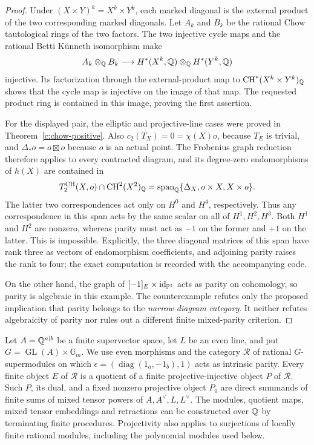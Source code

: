 \begin{proof}
Under $(X\times Y)^k=X^k\times Y^k$, each marked diagonal is
the external product of the two corresponding marked diagonals.
Let $A_k$ and $B_k$ be the rational Chow tautological rings of the
two factors.  The two injective cycle maps and the rational Betti
K\"unneth isomorphism make
\[
 A_k\otimes_\mathbb Q B_k\longrightarrow
 H^*(X^k,\mathbb Q)\otimes_\mathbb Q H^*(Y^k,\mathbb Q)
\]
injective.  Its factorization through the external-product map
to $\operatorname{CH}^*(X^k\times Y^k)_\mathbb Q$ shows that the cycle map is
injective on the image of that map.  The requested product ring
is contained in this image, proving the first assertion.

For the displayed pair, the elliptic and projective-line cases
were proved in Theorem~\ref{c:chow-positive}.
Also $c_2(T_X)=0=\chi(X)o$, because $T_E$ is trivial, and
$\Delta_*o=o\boxtimes o$ because $o$ is an actual point.
The Frobenius graph reduction therefore applies to every
contracted diagram, and its degree-zero endomorphisms of $h(X)$
are contained in
\[
 T^{\operatorname{CH}}_2(X,o)\cap\operatorname{CH}^2(X^2)_\mathbb Q
   =\operatorname{span}_\mathbb Q\{\Delta_X,o\times X,X\times o\}.
\]
The latter two correspondences act only on $H^0$ and $H^4$,
respectively.  Thus any correspondence in this span acts by the
same scalar on all of $H^1,H^2,H^3$.  Both $H^1$ and $H^2$ are
nonzero, whereas parity must act as $-1$ on the former and $+1$
on the latter.  This is impossible.  Explicitly, the three diagonal
matrices of this span have rank three as vectors of endomorphism
coefficients, and adjoining parity raises the rank to four; the
exact computation is recorded with the accompanying code.

On the other hand, the graph of
$[-1]_E\times\operatorname{id}_{\mathbb P^1}$ acts as parity on cohomology,
so parity is algebraic in this example.  The counterexample
refutes only the proposed implication that parity belongs to the
\emph{narrow diagram category}.  It neither refutes algebraicity
of parity nor rules out a different finite mixed-parity criterion.
\end{proof}


\begin{lemma}
\label{c:super-projective-tensors}
Let $A=\mathbb Q^{a|b}$ be a finite supervector space, let $L$ be an even
line, and put $G=\operatorname{GL}(A)\times\mathbb G_m$.
We use even morphisms and the category $\mathcal R$ of rational
$G$-supermodules on which
$\epsilon=(\operatorname{diag}(1_a,-1_b),1)$ acts as intrinsic parity.
Every finite object $E$ of $\mathcal R$ is a quotient of a finite
projective-injective object $P$ of $\mathcal R$.  Such $P$, its dual,
and a fixed nonzero projective object $P_0$ are direct summands of
finite sums of mixed tensor powers of $A,A^\vee,L,L^\vee$.
The modules, quotient maps, mixed tensor embeddings and retractions
can be constructed over $\mathbb Q$ by terminating finite procedures.
Projectivity also applies to surjections of locally finite rational
modules, including the polynomial modules used below.
\end{lemma}

